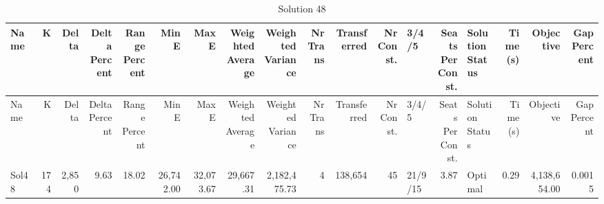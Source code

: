 \documentclass[a4paper]{article}
\begin{document}
{\scriptsize
\begin{longtable}{lrrrrrrrrrrrlrlrrr}
\caption{Solution 48}
\\ \toprule
Name &K &Delta &\shortstack{Delta\\Percent} &\shortstack{Range\\Percent} &Min E &Max E &\shortstack{Weighted\\Average} &\shortstack{Weighted\\Variance} &\shortstack{Nr\\Trans} &Transferred &\shortstack{Nr\\Const.} &3/4/5 &\shortstack{Seats\\Per\\Const.} &\shortstack{Solution\\Status} &\shortstack{Time\\(s)} &Objective &\shortstack{Gap\\Percent} \\ \midrule
\endfirsthead
\toprule
Name &K &Delta &\shortstack{Delta\\Percent} &\shortstack{Range\\Percent} &Min E &Max E &\shortstack{Weighted\\Average} &\shortstack{Weighted\\Variance} &\shortstack{Nr\\Trans} &Transferred &\shortstack{Nr\\Const.} &3/4/5 &\shortstack{Seats\\Per\\Const.} &\shortstack{Solution\\Status} &\shortstack{Time\\(s)} &Objective &\shortstack{Gap\\Percent} \\ \midrule
\endhead
\bottomrule
\endfoot
Sol48&174&2,850& 9.63&18.02&26,742.00&32,073.67&29,667.31&2,182,475.73&4&138,654&45&21/9/15& 3.87&Optimal& 0.29&4,138,654.00&0.0015\\ 
\end{longtable}

}
\end{document}
